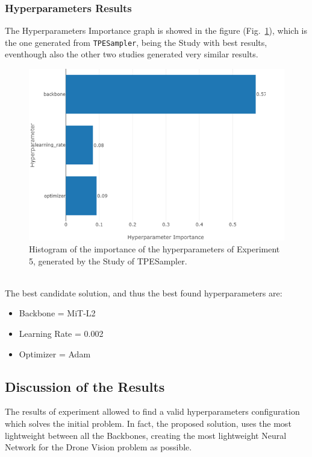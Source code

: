 \subsubsection{Hyperparameters Results}

The Hyperparameters Importance graph is showed in the figure (Fig.~\ref{fig:figure-4.5.5}), which is the one generated from \texttt{TPESampler}, being the Study with best results, eventhough also the other two studies generated very similar results.
\begin{figure}[t]
	\centering
	\includegraphics[width=13cm]{figures/figure-4.5.5.png}
	\caption[Hyperparameters Importance Histogram Experiment 5]{Histogram of the importance of the hyperparameters of Experiment 5, generated by the Study of TPESampler.}
	\label{fig:figure-4.5.5}
\end{figure}
\\[0.3cm]The best candidate solution, and thus the best found hyperparameters are:
\begin{itemize}[itemsep=0.1cm]
    \item Backbone = MiT-L2
    \item Learning Rate = 0.002
    \item Optimizer = Adam
\end{itemize}

\subsection{Discussion of the Results}

The results of experiment allowed to find a valid hyperparameters configuration which solves the initial problem.
In fact, the proposed solution, uses the most lightweight between all the Backbones, creating the most lightweight Neural Network for the Drone Vision problem as possible.

